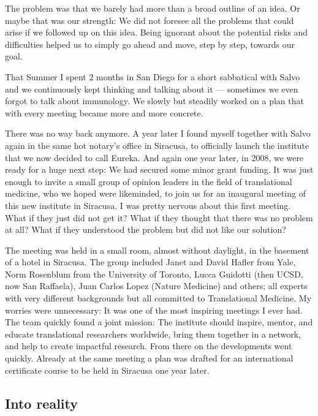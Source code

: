 \documentclass[authordate, editorial]{jote-new-article}
\begin{document}
	The problem was that we barely had more than a broad outline of an idea. Or maybe that was our strength: We did not foresee all the problems that could arise if we followed up on this idea. Being ignorant about the potential risks and difficulties helped us to simply go ahead and move, step by step, towards our goal.



	That Summer I spent 2 months in San Diego for a short sabbatical with Salvo and we continuously kept thinking and talking about it — sometimes we even forgot to talk about immunology. We slowly but steadily worked on a plan that with every meeting became more and more concrete.



	There was no way back anymore. A year later I found myself together with Salvo again in the same hot notary's office in Siracusa, to officially launch the institute that we now decided to call Eureka. And again one year later, in 2008, we were ready for a huge next step: We had secured some minor grant funding. It was just enough to invite a small group of opinion leaders in the field of translational medicine, who we hoped were likeminded, to join us for an inaugural meeting of this new institute in Siracusa. I was pretty nervous about this first meeting. What if they just did not get it? What if they thought that there was no problem at all? What if they understood the problem but did not like our solution?



	The meeting was held in a small room, almost without daylight, in the basement of a hotel in Siracusa. The group included Janet and David Hafler from Yale, Norm Rosenblum from the University of Toronto, Lucca Guidotti (then UCSD, now San Raffaela), Juan Carlos Lopez (Nature Medicine) and others; all experts with very different backgrounds but all committed to Translational Medicine. My worries were unnecessary: It was one of the most inspiring meetings I ever had. The team quickly found a joint mission: The institute should inspire, mentor, and educate translational researchers worldwide, bring them together in a network, and help to create impactful research. From there on the developments went quickly. Already at the same meeting a plan was drafted for an international certificate course to be held in Siracusa one year later.







	\subsection{Into reality }
\end{document}
